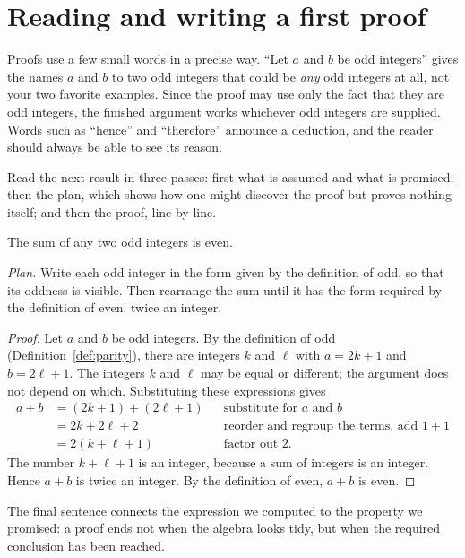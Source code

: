 \section{Reading and writing a first proof}\label{ch01:sec:first-proof}
Proofs use a few small words in a precise way. ``Let $a$ and $b$ be odd integers'' gives the names $a$ and $b$ to two odd integers that could be \emph{any} odd integers at all, not your two favorite examples. Since the proof may use only the fact that they are odd integers, the finished argument works whichever odd integers are supplied. Words such as ``hence'' and ``therefore'' announce a deduction, and the reader should always be able to see its reason.

Read the next result in three passes: first what is assumed and what is promised; then the plan, which shows how one might discover the proof but proves nothing itself; and then the proof, line by line.

\par\noindent\begin{minipage}{\linewidth}
\begin{proposition}\label{thm:odd-sum}
The sum of any two odd integers is even.
\end{proposition}
\end{minipage}\par

\noindent\textit{Plan.} Write each odd integer in the form given by the definition of odd, so that its oddness is visible. Then rearrange the sum until it has the form required by the definition of even: twice an integer.
\begin{proof}
Let $a$ and $b$ be odd integers. By the definition of odd (Definition~\ref{def:parity}), there are integers $k$ and $\ell$ with $a=2k+1$ and $b=2\ell+1$. The integers $k$ and $\ell$ may be equal or different; the argument does not depend on which. Substituting these expressions gives
\begin{align*}
a+b&=(2k+1)+(2\ell+1) &&\text{substitute for $a$ and $b$}\\
&=2k+2\ell+2 &&\text{reorder and regroup the terms, add $1+1$}\\
&=2(k+\ell+1) &&\text{factor out $2$.}
\end{align*}
The number $k+\ell+1$ is an integer, because a sum of integers is an integer. Hence $a+b$ is twice an integer. By the definition of even, $a+b$ is even.
\end{proof}

The final sentence connects the expression we computed to the property we promised: a proof ends not when the algebra looks tidy, but when the required conclusion has been reached.

